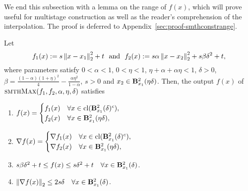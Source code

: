 We end this subsection with a lemma on the range of $f(x)$, which will prove useful for multistage construction as well as the reader's comprehension of the interpolation.
The proof is deferred to Appendix~\ref{sec:proof-smthconstrange}.
\begin{lemma}
	\label{lem:smthconstrange}
	Let 
	\begin{equation*}
		f_{1}(x) := s\left\|{x-x_1 }\right\|_2^2 + t~~\text{and}~~
		f_{2}(x) := s\alpha \left\|{x-x_2}\right\|_2^2 + s \beta \delta^2 + t,
	\end{equation*}
	where parameters satisfy $0<\alpha<1$, $0<\eta<1$, $\eta+\alpha+\alpha\eta<1$, $\delta>0$, $\beta = \frac{(1-\alpha)(1+\eta)^2}{4} - \frac{\alpha \eta^2}{1-\alpha}$, $s>0$ and $x_2 \in \mathbf{B}^2_{x_1}({\eta\delta})$.
	Then, the output $f(x)$ of $\textsc{smthMax}(f_{1}, f_{2}, \alpha, \eta, \delta)$ satisfies
	\begin{enumerate}
		\item \label{item:smthconstrange-7}
		$f(x) = \begin{cases}
		\fxone(x) &\forall x \in \cl(\balltwo{x_1}{\delta}^c), \\
		\fxtwo(x) &\forall x \in \balltwo{x_1}{\eta\delta},
		\end{cases}$
		\item \label{item:smthconstrange-8}
		$\nabla f(x) = \begin{cases}
		\nabla \fxone(x) &\forall x \in \cl(\balltwo{x_1}{\delta}^c), \\
		\nabla \fxtwo(x) &\forall x \in \balltwo{x_1}{\eta\delta},
		\end{cases}$
		\item \label{item:smthconstrange-3} 
		$s \beta \delta^2 + t\leq f(x) \leq s \delta^2 + t	\quad \forall x \in \mathbf{B}^2_{x_1}({\delta})$.
		\item \label{item:smthconstrange-4}
		$\left\|{\nabla f(x)}\right\|_2 \leq 2 s\delta \quad \forall x \in \mathbf{B}^2_{x_1}({\delta})$.
	\end{enumerate}
\end{lemma}

